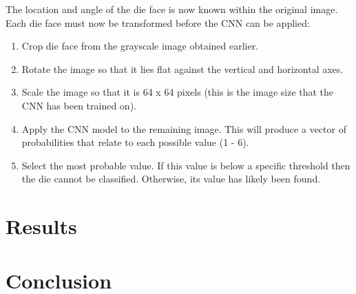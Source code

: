 \documentclass[conference]{IEEEtran}
\begin{document}
The location and angle of the die face is now known within the original image.
Each die face must now be transformed before the CNN can be applied:
\begin{enumerate}
	\item Crop die face from the grayscale image obtained earlier.
	\item Rotate the image so that it lies flat against the vertical and horizontal axes.
	\item Scale the image so that it is 64 x 64 pixels (this is the image size that the CNN has been trained on).
	\item Apply the CNN model to the remaining image. This will produce a vector of probabilities that relate to each possible value (1 - 6).
	\item Select the most probable value. 
		If this value is below a specific threshold then the die cannot be classified.
		Otherwise, its value has likely been found.
\end{enumerate}
\section{Results}

\section{Conclusion}

\printbibliography
\end{document}

